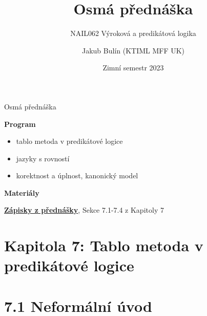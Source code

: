 \documentclass{beamer}
\title{Osmá přednáška}
\subtitle{NAIL062 Výroková a predikátová logika}
\author{Jakub Bulín (KTIML MFF UK)}
\date{Zimní semestr 2023}
\begin{document}
\frame{\titlepage}


\begin{frame}{Osmá přednáška}

    \textbf{Program}
        \begin{itemize}
            \item tablo metoda v predikátové logice
            \item jazyky s rovností
            \item korektnost a úplnost, kanonický model
        \end{itemize}

    \textbf{Materiály}

        \href{https://github.com/jbulin-mff-uk/nail062/raw/main/lecture/lecture-notes/lecture-notes.pdf}{\alert{\textbf{Zápisky z přednášky}}}, Sekce 7.1-7.4 z Kapitoly 7

\end{frame}


\section{\sc Kapitola 7: Tablo metoda v predikátové logice}


\section{7.1 Neformální úvod}
\end{document}
